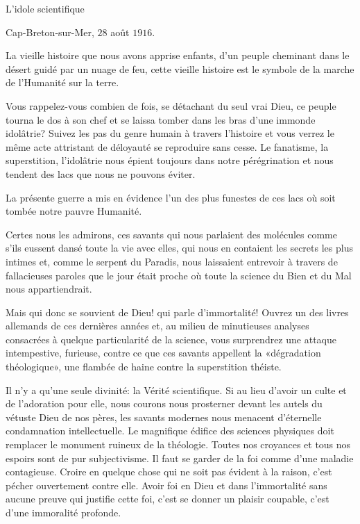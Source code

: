 \begin{chapter}{L'idole scientifique}

\begin{flushright}
Cap-Breton-sur-Mer, $28$ août $1916$.
\end{flushright}

La vieille histoire que nous avons apprise enfants, d'un peuple
cheminant dans le désert guidé par un nuage de feu, cette vieille
histoire est le symbole de la marche de l'Humanité sur la terre.

Vous rappelez-vous combien de fois, se détachant du seul vrai Dieu, ce
peuple tourna le dos à son chef et se laissa tomber dans les bras d'une
immonde idolâtrie? Suivez les pas du genre humain à travers l'histoire
et vous verrez le même acte attristant de déloyauté se reproduire sans
cesse. Le fanatisme, la superstition, l'idolâtrie nous épient toujours
dans notre pérégrination et nous tendent des lacs que nous ne pouvons
éviter.

La présente guerre a mis en évidence l'un des plus funestes de ces lacs
où soit tombée notre pauvre Humanité.

Certes nous les admirons, ces savants qui nous parlaient des molécules
comme s'ils eussent dansé toute la vie avec elles, qui nous en contaient
les secrets les plus intimes et, comme le serpent du Paradis, nous
laissaient entrevoir à travers de fallacieuses paroles que le jour était
proche où toute la science du Bien et du Mal nous appartiendrait.

Mais qui donc se souvient de Dieu! qui parle d'immortalité! Ouvrez un
des livres allemands de ces dernières années et, au milieu de
minutieuses analyses consacrées à quelque particularité de la science,
vous surprendrez une attaque intempestive, furieuse, contre ce que ces
savants appellent la «dégradation théologique», une flambée de haine
contre la superstition théiste.

Il n'y a qu'une seule divinité: la Vérité scientifique. Si au lieu
d'avoir un culte et de l'adoration pour elle, nous courons nous
prosterner devant les autels du vétuste Dieu de nos pères, les savants
modernes nous menacent d'éternelle condamnation intellectuelle. Le
magnifique édifice des sciences physiques doit remplacer le monument
ruineux de la théologie. Toutes nos croyances et tous nos espoirs sont
de pur subjectivisme. Il faut se garder de la foi comme d'une maladie
contagieuse. Croire en quelque chose qui ne soit pas évident à la
raison, c'est pécher ouvertement contre elle. Avoir foi en Dieu et dans
l'immortalité sans aucune preuve qui justifie cette foi, c'est se donner
un plaisir coupable, c'est d'une immoralité profonde.


\end{chapter}

